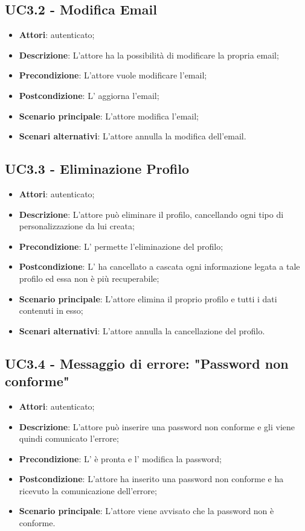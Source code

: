 \subsection{UC3.2 - Modifica Email}
\label{ssec:UC3.2}
\begin{itemize}
\item \textbf{Attori}:  autenticato;
\item \textbf{Descrizione}: L'attore ha la possibilità di modificare la propria email;
\item \textbf{Precondizione}: L'attore vuole modificare l'email;
\item \textbf{Postcondizione}: L' aggiorna l'email;
\item \textbf{Scenario principale}: L'attore modifica l'email;
\item \textbf{Scenari alternativi}: L'attore annulla la modifica dell'email.
\end{itemize}
\subsection{UC3.3 - Eliminazione Profilo}
\label{ssec:UC3.3}
\begin{itemize}
\item \textbf{Attori}:  autenticato;
\item \textbf{Descrizione}: L'attore può eliminare il profilo, cancellando ogni tipo di personalizzazione da lui creata;
\item \textbf{Precondizione}: L' permette l'eliminazione del profilo;
\item \textbf{Postcondizione}: L' ha cancellato a cascata ogni informazione legata a tale profilo ed essa non è più recuperabile;
\item \textbf{Scenario principale}: L'attore elimina il proprio profilo e tutti i dati contenuti in esso;
\item \textbf{Scenari alternativi}: L'attore annulla la cancellazione del profilo.
\end{itemize}
\subsection{UC3.4 - Messaggio di errore: "Password non conforme"}
\label{ssec:UC3.4}
\begin{itemize}
\item \textbf{Attori}:  autenticato;
\item \textbf{Descrizione}: L'attore può inserire una password non conforme e gli viene quindi comunicato l'errore;
\item \textbf{Precondizione}: L' è pronta e l' modifica la password;
\item \textbf{Postcondizione}: L'attore ha inserito una password non conforme e ha ricevuto la comunicazione dell'errore;
\item \textbf{Scenario principale}: L'attore viene avvisato che la password non è conforme.
\end{itemize}
